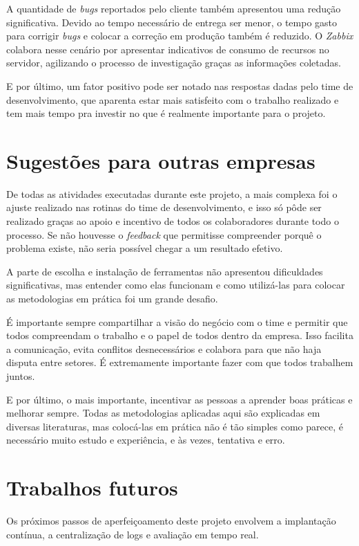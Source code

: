 \documentclass[
12pt,				%
openright,			%
oneside,			%
a4paper,			%
english,			%
french,				%
spanish,			%
brazil,				%
]{abntex2}
\begin{document}
A quantidade de \textit{bugs} reportados pelo cliente também apresentou uma redução significativa. Devido ao tempo necessário de entrega ser menor, o tempo gasto para corrigir \textit{bugs} e colocar a correção em produção também é reduzido. O \textit{Zabbix} colabora nesse cenário por apresentar indicativos de consumo de recursos no servidor, agilizando o processo de investigação graças as informações coletadas.

E por último, um fator positivo pode ser notado nas respostas dadas pelo time de desenvolvimento, que aparenta estar mais satisfeito com o trabalho realizado e tem mais tempo pra investir no que é realmente importante para o projeto.

\chapter{Sugestões para outras empresas}

De todas as atividades executadas durante este projeto, a mais complexa foi o ajuste realizado nas rotinas do time de desenvolvimento, e isso só pôde ser realizado graças ao apoio e incentivo de todos os colaboradores durante todo o processo. Se não houvesse o \textit{feedback} que permitisse compreender porquê o problema existe, não seria possível chegar a um resultado efetivo.

A parte de escolha e instalação de ferramentas não apresentou dificuldades significativas, mas entender como elas funcionam e como utilizá-las para colocar as metodologias em prática foi um grande desafio.

É importante sempre compartilhar a visão do negócio com o time e permitir que todos compreendam o trabalho e o papel de todos dentro da empresa. Isso facilita a comunicação, evita conflitos desnecessários e colabora para que não haja disputa entre setores. É extremamente importante fazer com que todos trabalhem juntos.

E por último, o mais importante, incentivar as pessoas a aprender boas práticas e melhorar sempre. Todas as metodologias aplicadas aqui são explicadas em diversas literaturas, mas colocá-las em prática não é tão simples como parece, é necessário muito estudo e experiência, e às vezes, tentativa e erro.

\chapter{Trabalhos futuros}

Os próximos passos de aperfeiçoamento deste projeto envolvem a implantação contínua, a centralização de logs e avaliação em tempo real.
\end{document}
